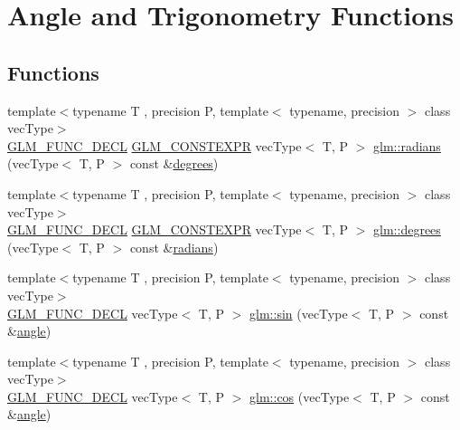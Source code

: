 \hypertarget{group__core__func__trigonometric}{}\section{Angle and Trigonometry Functions}
\label{group__core__func__trigonometric}
\subsection*{Functions}
\begin{DoxyCompactItemize}
\item 
{\footnotesize template$<$typename T , precision P, template$<$ typename, precision $>$ class vec\+Type$>$ }\\\mbox{\hyperlink{setup_8hpp_ab2d052de21a70539923e9bcbf6e83a51}{G\+L\+M\+\_\+\+F\+U\+N\+C\+\_\+\+D\+E\+CL}} \mbox{\hyperlink{setup_8hpp_a08b807947b47031d3a511f03f89645ad}{G\+L\+M\+\_\+\+C\+O\+N\+S\+T\+E\+X\+PR}} vec\+Type$<$ T, P $>$ \mbox{\hyperlink{group__core__func__trigonometric_gafffb5e533f75318bdf4e0967d8a6c05c}{glm\+::radians}} (vec\+Type$<$ T, P $>$ const \&\mbox{\hyperlink{group__core__func__trigonometric_gabccdcc282134fd62af0ff3d6e4bb21f1}{degrees}})
\item 
{\footnotesize template$<$typename T , precision P, template$<$ typename, precision $>$ class vec\+Type$>$ }\\\mbox{\hyperlink{setup_8hpp_ab2d052de21a70539923e9bcbf6e83a51}{G\+L\+M\+\_\+\+F\+U\+N\+C\+\_\+\+D\+E\+CL}} \mbox{\hyperlink{setup_8hpp_a08b807947b47031d3a511f03f89645ad}{G\+L\+M\+\_\+\+C\+O\+N\+S\+T\+E\+X\+PR}} vec\+Type$<$ T, P $>$ \mbox{\hyperlink{group__core__func__trigonometric_gabccdcc282134fd62af0ff3d6e4bb21f1}{glm\+::degrees}} (vec\+Type$<$ T, P $>$ const \&\mbox{\hyperlink{group__core__func__trigonometric_gafffb5e533f75318bdf4e0967d8a6c05c}{radians}})
\item 
{\footnotesize template$<$typename T , precision P, template$<$ typename, precision $>$ class vec\+Type$>$ }\\\mbox{\hyperlink{setup_8hpp_ab2d052de21a70539923e9bcbf6e83a51}{G\+L\+M\+\_\+\+F\+U\+N\+C\+\_\+\+D\+E\+CL}} vec\+Type$<$ T, P $>$ \mbox{\hyperlink{group__core__func__trigonometric_ga4a0ddceb6b1e64ce0e4da209dcb021d5}{glm\+::sin}} (vec\+Type$<$ T, P $>$ const \&\mbox{\hyperlink{group__gtc__quaternion_gad4a4448baedb198b2b1e7880d2544dc9}{angle}})
\item 
{\footnotesize template$<$typename T , precision P, template$<$ typename, precision $>$ class vec\+Type$>$ }\\\mbox{\hyperlink{setup_8hpp_ab2d052de21a70539923e9bcbf6e83a51}{G\+L\+M\+\_\+\+F\+U\+N\+C\+\_\+\+D\+E\+CL}} vec\+Type$<$ T, P $>$ \mbox{\hyperlink{group__core__func__trigonometric_ga728fd86f14609e37d83f82429995b7b3}{glm\+::cos}} (vec\+Type$<$ T, P $>$ const \&\mbox{\hyperlink{group__gtc__quaternion_gad4a4448baedb198b2b1e7880d2544dc9}{angle}})

\end{DoxyCompactItemize}
